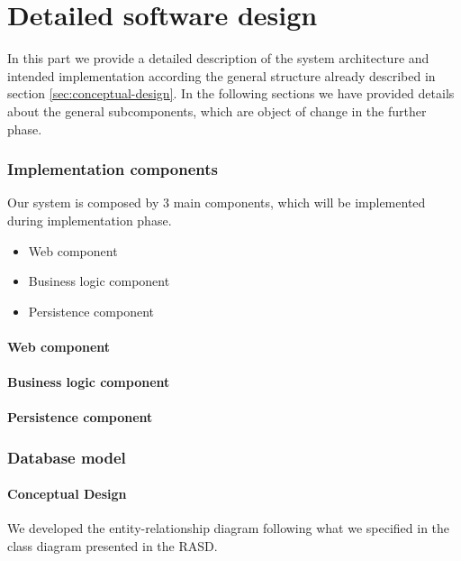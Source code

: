 \documentclass[10pt,a4paper,titlepage]{article}
\begin{document}
\clearpage
\part{Detailed software design}
\label{part:detailed-software-design}
In this part we provide a detailed description of the system architecture and intended implementation according the general structure already described in section \ref{sec:conceptual-design}.
In the following sections we have provided details about the general subcomponents, which are object of change in the further phase.

\section{Implementation components}
Our system is composed by 3 main components, which will be implemented during implementation phase.
\begin{itemize}
\item Web component
\item Business logic component
\item Persistence component
\end{itemize}

\subsection{Web component}
\label{subsec:WebComponent}

\subsection{Business logic component}

\subsection{Persistence component}

\section{Database model}
\label{sec:DatabaseModel}
\subsection{Conceptual Design}
We developed the entity-relationship diagram following what we specified in the class diagram presented in the RASD. 
\end{document}
